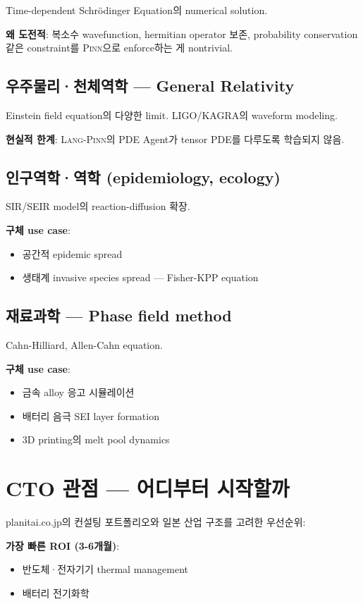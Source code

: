\documentclass[11pt,a4paper,oneside]{report}
\newcommand{\pinn}{\textsc{Pinn}}
\newcommand{\langpinn}{\textsc{Lang-Pinn}}
\begin{document}
Time-dependent Schr\"{o}dinger Equation의 numerical solution.

\textbf{왜 도전적}: 복소수 wavefunction, hermitian operator 보존, probability conservation 같은 constraint를 \pinn{}으로 enforce하는 게 nontrivial.

\subsection{우주물리·천체역학 --- General Relativity}

Einstein field equation의 다양한 limit. LIGO/KAGRA의 waveform modeling.

\textbf{현실적 한계}: \langpinn{}의 PDE Agent가 tensor PDE를 다루도록 학습되지 않음.

\subsection{인구역학·역학 (epidemiology, ecology)}

SIR/SEIR model의 reaction-diffusion 확장.

\textbf{구체 use case}:
\begin{itemize}
\item 공간적 epidemic spread
\item 생태계 invasive species spread --- Fisher-KPP equation
\end{itemize}

\subsection{재료과학 --- Phase field method}

Cahn-Hilliard, Allen-Cahn equation.

\textbf{구체 use case}:
\begin{itemize}
\item 금속 alloy 응고 시뮬레이션
\item 배터리 음극 SEI layer formation
\item 3D printing의 melt pool dynamics
\end{itemize}

\section{CTO 관점 --- 어디부터 시작할까}

planitai.co.jp의 컨설팅 포트폴리오와 일본 산업 구조를 고려한 우선순위:

\textbf{가장 빠른 ROI (3-6개월)}:
\begin{itemize}
\item 반도체·전자기기 thermal management
\item 배터리 전기화학
\end{itemize}
\end{document}
